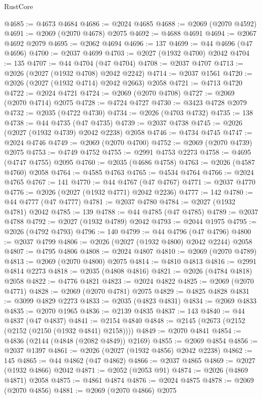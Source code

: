 \begin{lexlean}{RustCore}
\begin{coremodule}
@4685 := @4673 @4684
@4686 := @2024 @4685
@4688 := @2069 (@2070 @4592)
@4691 := @2069 (@2070 @4678) @2075
@4692 := @4688 @4691
@4694 := @2067 @4692 @2079
@4695 := @2062 @4694
@4696 := 137
@4699 := @44 @4696 (@47 @4696)
@4700 := @2037 @4699
@4703 := @2027 (@1932 @4700) @2042
@4704 := 135
@4707 := @44 @4704 (@47 @4704)
@4708 := @2037 @4707
@4713 := @2026 (@2027 (@1932 @4708) @2042 @2242)
@4714 := @2037 @1561
@4720 := @2026 (@2027 (@1932 @4714) @2042 @2663) @2058
@4721 := @4713 @4720
@4722 := @2024 @4721
@4724 := @2069 (@2070 @4708)
@4727 := @2069 (@2070 @4714) @2075
@4728 := @4724 @4727
@4730 := @3423 @4728 @2079
@4732 := @2035 (@4722 @4730)
@4734 := @2026 (@4703 @4732)
@4735 := 138
@4738 := @44 @4735 (@47 @4735)
@4739 := @2037 @4738
@4745 := @2026 (@2027 (@1932 @4739) @2042 @2238) @2058
@4746 := @4734 @4745
@4747 := @2024 @4746
@4749 := @2069 (@2070 @4700)
@4752 := @2069 (@2070 @4739) @2075
@4753 := @4749 @4752
@4755 := @2991 @4753 @2273
@4758 := @4695 (@4747 @4755) @2095
@4760 := @2035 (@4686 @4758)
@4763 := @2026 (@4587 @4760) @2058
@4764 := @4585 @4763
@4765 := @4534 @4764
@4766 := @2024 @4765
@4767 := 141
@4770 := @44 @4767 (@47 @4767)
@4771 := @2037 @4770
@4776 := @2026 (@2027 (@1932 @4771) @2042 @2236)
@4777 := 142
@4780 := @44 @4777 (@47 @4777)
@4781 := @2037 @4780
@4784 := @2027 (@1932 @4781) @2042
@4785 := 139
@4788 := @44 @4785 (@47 @4785)
@4789 := @2037 @4788
@4792 := @2027 (@1932 @4789) @2042
@4793 := @2044 @1975
@4795 := @2026 (@4792 @4793)
@4796 := 140
@4799 := @44 @4796 (@47 @4796)
@4800 := @2037 @4799
@4806 := @2026 (@2027 (@1932 @4800) @2042 @2244) @2058
@4807 := @4795 @4806
@4808 := @2024 @4807
@4810 := @2069 (@2070 @4789)
@4813 := @2069 (@2070 @4800) @2075
@4814 := @4810 @4813
@4816 := @2991 @4814 @2273
@4818 := @2035 (@4808 @4816)
@4821 := @2026 (@4784 @4818) @2058
@4822 := @4776 @4821
@4823 := @2024 @4822
@4825 := @2069 (@2070 @4771)
@4828 := @2069 (@2070 @4781) @2075
@4829 := @4825 @4828
@4831 := @3099 @4829 @2273
@4833 := @2035 (@4823 @4831)
@4834 := @2069 @4833
@4835 := @2070 @1965
@4836 := @2139 @4835
@4837 := 143
@4840 := @44 @4837 (@47 @4837)
@4841 := @2154 @4840
@4848 := @2145 (@2673 (@2152 (@2152 (@2150 (@1932 @4841) @2158))))
@4849 := @2070 @4841
@4854 := @4836 (@2144 (@4848 (@2082 @4849)) @2169)
@4855 := @2069 @4854
@4856 := @2037 @1397
@4861 := @2026 (@2027 (@1932 @4856) @2042 @2238)
@4862 := 145
@4865 := @44 @4862 (@47 @4862)
@4866 := @2037 @4865
@4869 := @2027 (@1932 @4866) @2042
@4871 := @2052 (@2053 @91)
@4874 := @2026 (@4869 @4871) @2058
@4875 := @4861 @4874
@4876 := @2024 @4875
@4878 := @2069 (@2070 @4856)
@4881 := @2069 (@2070 @4866) @2075

\end{coremodule}
\end{lexlean}
